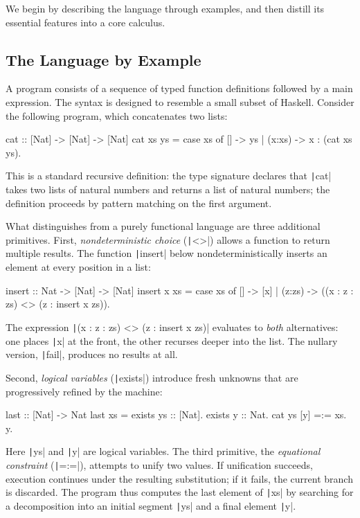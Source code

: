 We begin by describing the \Gweek{} language through examples, and then distill
its essential features into a core calculus.

\subsection{The Language by Example}

A \Gweek{} program consists of a sequence of typed function definitions followed
by a main expression. The syntax is designed to resemble a small subset of
Haskell. Consider the following program, which concatenates two lists:
%
\begin{haskellcode}
cat :: [Nat] -> [Nat] -> [Nat]
cat xs ys = case xs of
      [] -> ys
    | (x:xs) -> x : (cat xs ys).
\end{haskellcode}
%
\noindent This is a standard recursive definition: the type signature declares
that \texttt|cat| takes two lists of natural numbers and returns a
list of natural numbers; the definition proceeds by pattern matching on the first
argument.

What distinguishes \Gweek{} from a purely functional language are three
additional primitives. First, \emph{nondeterministic choice}
(\texttt|<>|) allows a function to return multiple results. The
function \texttt|insert| below nondeterministically inserts an
element at every position in a list:
%
\begin{haskellcode}
insert :: Nat -> [Nat] -> [Nat]
insert x xs = case xs of
      [] -> [x]
    | (z:zs) -> ((x : z : zs) <> (z : insert x zs)).
\end{haskellcode}
%
\noindent The expression \texttt|(x : z : zs) <> (z : insert x zs)|
evaluates to \emph{both} alternatives: one places \texttt|x| at
the front, the other recurses deeper into the list. The nullary version,
\texttt|fail|, produces no results at all.

Second, \emph{logical variables} (\texttt|exists|) introduce fresh
unknowns that are progressively refined by the machine:
%
\begin{haskellcode}
last :: [Nat] -> Nat
last xs = exists ys :: [Nat]. exists y :: Nat.
    cat ys [y] =:= xs. y.
\end{haskellcode}
%
\noindent Here \texttt|ys| and \texttt|y| are
logical variables. The third primitive, the \emph{equational constraint}
(\texttt|=:=|), attempts to unify two values. If unification
succeeds, execution continues under the resulting substitution; if it fails, the
current branch is discarded. The program thus computes the last element of
\texttt|xs| by searching for a decomposition into an initial
segment \texttt|ys| and a final element \texttt|y|.

